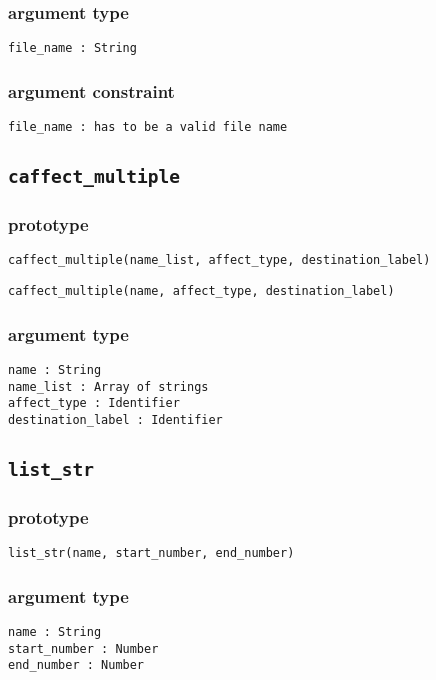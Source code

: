 \documentclass{article}
\begin{document}
\subsubsection*{argument type}
\texttt{file_name : String}
\subsubsection*{argument constraint}
\texttt{file_name : has to be a valid file name}

\subsection{\texttt{caffect_multiple}}
\subsubsection*{prototype}
\begin{lstlisting}
caffect_multiple(name_list, affect_type, destination_label)
\end{lstlisting}
\begin{lstlisting}
caffect_multiple(name, affect_type, destination_label)
\end{lstlisting}
\subsubsection*{argument type}
\texttt{name : String}\\
\texttt{name_list : Array of strings}\\
\texttt{affect_type : Identifier}\\
\texttt{destination_label : Identifier}

\subsection{\texttt{list_str}}
\subsubsection*{prototype}
\begin{lstlisting}
list_str(name, start_number, end_number)
\end{lstlisting}
\subsubsection*{argument type}
\texttt{name : String}\\
\texttt{start_number : Number}\\
\texttt{end_number : Number}
\end{document}
